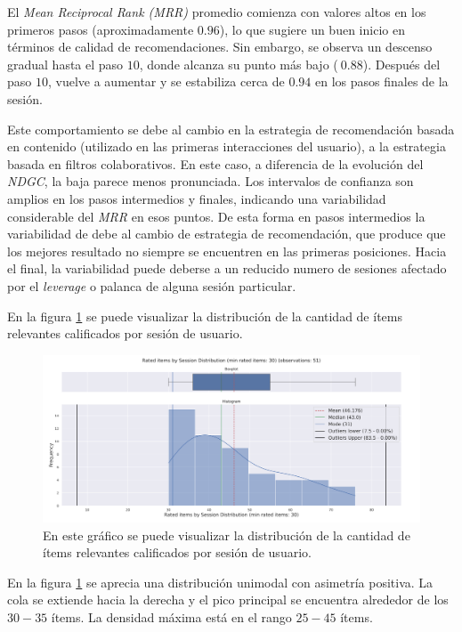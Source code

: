 \documentclass[11pt,a4paper,twoside]{thesis}
\begin{document}
El \textit{Mean Reciprocal Rank (MRR)} promedio comienza con valores altos en los primeros pasos (aproximadamente $0.96$), lo que sugiere un buen inicio en términos de calidad de recomendaciones. Sin embargo, se observa un descenso gradual hasta el paso $10$, donde alcanza su punto más bajo ($~0.88$). Después del paso $10$, vuelve a aumentar y se estabiliza cerca de $0.94$ en los pasos finales de la sesión.

Este comportamiento se debe al cambio en la estrategia de recomendación basada en contenido (utilizado en las primeras interacciones del usuario), a la estrategia basada en filtros colaborativos. En este caso, a diferencia de la evolución del \textit{NDGC}, la baja parece menos pronunciada. Los intervalos de confianza son amplios en los pasos intermedios y finales, indicando una variabilidad considerable del \textit{MRR} en esos puntos. De esta forma en pasos intermedios la variabilidad de debe al cambio de estrategia de recomendación, que produce que los mejores resultado no siempre se encuentren en las primeras posiciones. Hacia el final, la variabilidad puede deberse a un reducido numero de sesiones afectado por el \textit{leverage} o palanca de alguna sesión particular.


\clearpage

En la figura \ref{fig:llama2-rated_items_by_session_distribution} se puede visualizar la distribución de la cantidad de ítems relevantes calificados por sesión de usuario.

\begin{figure}[H]
	\centering
	\includegraphics[width=15cm]{./images/llama2/rated_items_by_session_distribution.png}
	\caption{En este gráfico se puede visualizar la distribución de la cantidad de ítems relevantes calificados por sesión de usuario.}
	\label{fig:llama2-rated_items_by_session_distribution}
\end{figure}

En la figura \ref{fig:llama2-rated_items_by_session_distribution}  se aprecia  una distribución unimodal con asimetría positiva. La cola se extiende hacia la derecha y el pico principal se encuentra alrededor de los $30-35$ ítems. La densidad máxima está en el rango $25-45$ ítems.
\end{document}

